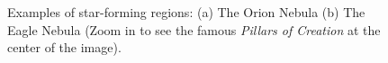 \vfill
\begin{figure}[h!]
    \centering
    \begin{minipage}{.5\linewidth}
        \centering
    \end{minipage}%
    \begin{minipage}{.5\linewidth}
        \centering
    \end{minipage}
    \caption{Examples of star-forming regions: (a) The Orion Nebula (b) The Eagle Nebula
        (Zoom in to see the famous \textit{Pillars of Creation} at the center of the image).
    }
    \label{fig:star_forming_regions}
\end{figure}

